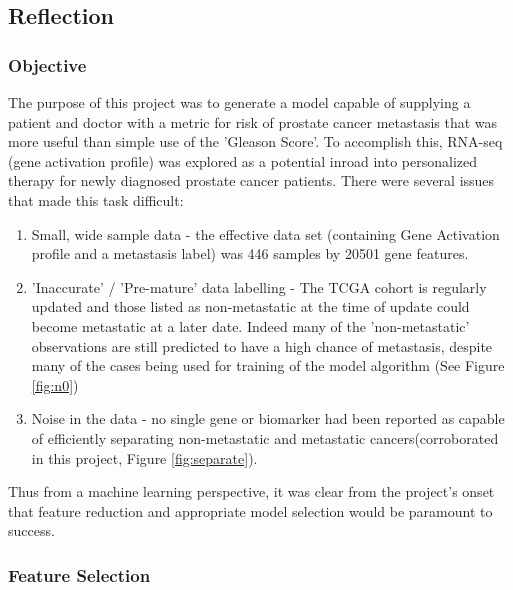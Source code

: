 \documentclass[final]{article}
\begin{document}
\subsection{Reflection}

\subsubsection{Objective}

The purpose of this project was to generate a model capable of supplying a
patient and doctor with a metric for risk of prostate cancer metastasis that was
more useful than simple use of the 'Gleason Score'.  To accomplish this, RNA-seq
(gene activation profile) was explored as a potential inroad into personalized
therapy for newly diagnosed prostate cancer patients.  There were several issues
that made this task difficult:

\begin{enumerate} \item Small, wide sample data - the effective data set
(containing Gene Activation profile and a metastasis label) was 446 samples by
20501 gene features.
\item 'Inaccurate' / 'Pre-mature' data labelling - The TCGA
cohort is regularly updated and those listed as non-metastatic at the time of
update could become metastatic at a later date.  Indeed many of the
'non-metastatic' observations are still predicted to have a high chance of
metastasis, despite many of the cases being used for training of the model
algorithm (See Figure \ref{fig:n0})
\item Noise in the data - no single gene or
biomarker had been reported as capable of efficiently separating non-metastatic
and metastatic cancers(corroborated in this project, Figure \ref{fig:separate}).
\end{enumerate}

Thus from a machine learning perspective, it was clear from the project's onset
that feature reduction and appropriate model selection would be paramount to
success.

\subsubsection{Feature Selection}
\end{document}
